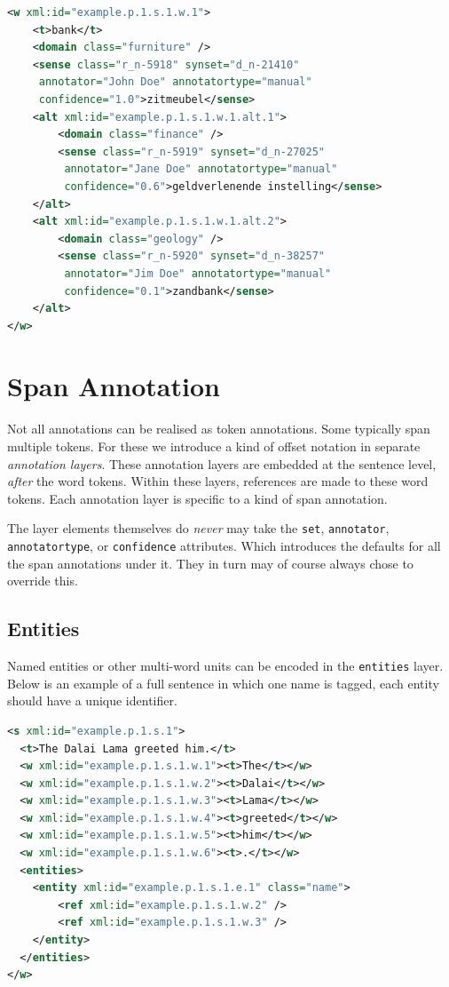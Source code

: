 \documentclass[a4paper,12pt]{report}
\begin{document}
\begin{lstlisting}[language=xml]
<w xml:id="example.p.1.s.1.w.1">
    <t>bank</t>
    <domain class="furniture" />
    <sense class="r_n-5918" synset="d_n-21410" 
     annotator="John Doe" annotatortype="manual" 
     confidence="1.0">zitmeubel</sense>
    <alt xml:id="example.p.1.s.1.w.1.alt.1">
        <domain class="finance" />
        <sense class="r_n-5919" synset="d_n-27025"
         annotator="Jane Doe" annotatortype="manual" 
         confidence="0.6">geldverlenende instelling</sense>        
    </alt>
    <alt xml:id="example.p.1.s.1.w.1.alt.2">
        <domain class="geology" />
        <sense class="r_n-5920" synset="d_n-38257"
         annotator="Jim Doe" annotatortype="manual"
         confidence="0.1">zandbank</sense>        
    </alt>    
</w>
\end{lstlisting}


\section{Span Annotation}

Not all annotations can be realised as token annotations. Some typically span multiple tokens. For these we introduce a kind of offset notation in separate \emph{annotation layers}. These annotation layers are embedded at the sentence level, \emph{after} the word tokens. Within these layers, references are made to these word tokens. Each annotation layer is specific to a kind of span annotation.

The layer elements themselves do \emph{never} may take the \texttt{set}, \texttt{annotator}, \texttt{annotatortype}, or \texttt{confidence} attributes. Which introduces the defaults for all the span annotations under it. They in turn may of course always chose to override this.

\subsection{Entities}

Named entities or other multi-word units can be encoded in the \texttt{entities} layer. Below is an example of a full sentence in which one name is tagged, each entity should have a unique identifier.


\begin{lstlisting}[language=xml]
<s xml:id="example.p.1.s.1">
  <t>The Dalai Lama greeted him.</t>
  <w xml:id="example.p.1.s.1.w.1"><t>The</t></w>
  <w xml:id="example.p.1.s.1.w.2"><t>Dalai</t></w>
  <w xml:id="example.p.1.s.1.w.3"><t>Lama</t></w>
  <w xml:id="example.p.1.s.1.w.4"><t>greeted</t></w>
  <w xml:id="example.p.1.s.1.w.5"><t>him</t></w>
  <w xml:id="example.p.1.s.1.w.6"><t>.</t></w>
  <entities>
    <entity xml:id="example.p.1.s.1.e.1" class="name">
        <ref xml:id="example.p.1.s.1.w.2" />
        <ref xml:id="example.p.1.s.1.w.3" />
    </entity>
  </entities>
</w>
\end{lstlisting}
\end{document}

